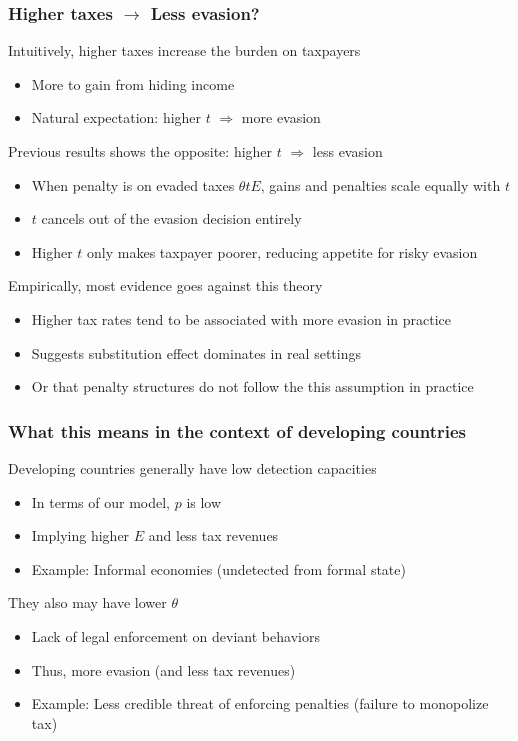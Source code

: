 \documentclass[aspectratio=169]{beamer}
\begin{document}
\begin{frame}
\frametitle{Higher taxes $\to$ Less evasion?}
Intuitively, higher taxes increase the burden on taxpayers
\begin{itemize}\setlength\itemsep{3pt}
\item More to gain from hiding income
\item Natural expectation: higher $t$ $\Rightarrow$ more evasion
\end{itemize}\medskip
 Previous results shows the opposite: higher $t$ $\Rightarrow$ less evasion
\begin{itemize}\setlength\itemsep{3pt}
\item When penalty is on evaded taxes $\theta t E$, gains and penalties scale equally with $t$
\item $t$ cancels out of the evasion decision entirely
\item Higher $t$ only makes taxpayer poorer, reducing appetite for risky evasion
\end{itemize}\medskip
Empirically, most evidence goes against this theory
\begin{itemize}\setlength\itemsep{3pt}
\item Higher tax rates tend to be associated with more evasion in practice
\item Suggests substitution effect dominates in real settings
\item Or that penalty structures do not follow the this assumption in practice
\end{itemize}
\end{frame}

\begin{frame}
\frametitle{What this means in the context of developing countries}
Developing countries generally have low detection capacities
\begin{itemize}\setlength\itemsep{3pt}
\item In terms of our model, $p$ is low
\item Implying higher $E$ and less tax revenues
\item Example: Informal economies (undetected from formal state)
\end{itemize}\medskip
 They also may have lower $\theta$
\begin{itemize}\setlength\itemsep{3pt}
\item Lack of legal enforcement on deviant behaviors
\item Thus, more evasion (and less tax revenues)
\item Example: Less credible threat of enforcing penalties (failure to monopolize tax)
\end{itemize}\medskip
\end{frame}
\end{document}
